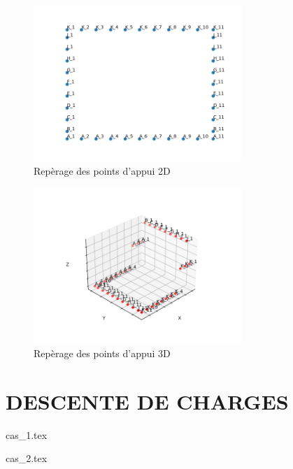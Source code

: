 \documentclass{rSIMONIN} %
\begin{document}
\begin{figure}[H] %
    \centering %
    \includegraphics[width=0.7\textwidth]{assets/img/reperage_points_appuis.png} %
    \caption{Repèrage des points d'appui 2D} %
\end{figure}

\begin{figure}[H] %
    \centering %
    \includegraphics[width=0.7\textwidth]{assets/img/reperage_points_appuis_3D.png} %
    \caption{Repèrage des points d'appui 3D} %
\end{figure}



\newpage
\chapter{DESCENTE DE CHARGES}


{cas_1.tex}

\newpage

{cas_2.tex}

\newpage


\newpage


\newpage
{

    \listoffigures

    \listoftables
}
\end{document}
